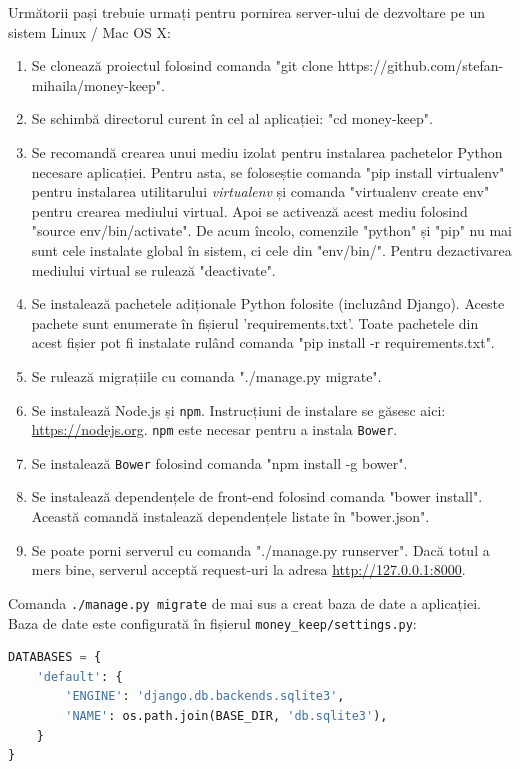 Următorii pași trebuie urmați pentru pornirea server-ului
de dezvoltare pe un sistem Linux / Mac OS X:
\begin{enumerate}
\item Se clonează proiectul folosind comanda
"git clone https://github.com/stefan-mihaila/money-keep".
\item Se schimbă directorul curent în cel al aplicației: "cd money-keep".
\item Se recomandă crearea unui mediu izolat pentru 
instalarea pachetelor Python necesare aplicației.
Pentru asta, se foloseștie comanda "pip install virtualenv"
pentru instalarea utilitarului \emph{virtualenv}
și comanda "virtualenv create env" pentru crearea
mediului virtual. Apoi se activează acest mediu
folosind "source env/bin/activate". De acum încolo,
comenzile "python" și "pip" nu mai sunt cele instalate
global în sistem, ci cele din "env/bin/". Pentru dezactivarea
mediului virtual se rulează "deactivate".
\item Se instalează pachetele adiționale Python folosite 
(incluzând Django). Aceste pachete sunt enumerate în fișierul
'requirements.txt'. Toate pachetele din acest fișier pot
fi instalate rulând comanda "pip install -r requirements.txt".
\item Se rulează migrațiile cu comanda "./manage.py migrate".
\item Se instalează Node.js și \texttt{npm}. Instrucțiuni de instalare se găsesc aici:
\url{https://nodejs.org}. \texttt{npm} este necesar pentru a instala \texttt{Bower}.
\item Se instalează \texttt{Bower} folosind comanda "npm install -g bower".
\item Se instalează dependențele de front-end folosind comanda
"bower install". Această comandă instalează dependențele listate
în "bower.json".
\item Se poate porni serverul cu comanda "./manage.py runserver". Dacă
totul a mers bine, serverul acceptă request-uri la adresa \url{http://127.0.0.1:8000}.
\end{enumerate}

Comanda \texttt{./manage.py migrate} de mai sus a creat baza de date
a aplicației. Baza de date este configurată în fișierul 
\texttt{money\_keep/settings.py}:

\begin{lstlisting}[language=python, title=Configurare implicită a bazei de date]
DATABASES = {
    'default': {
        'ENGINE': 'django.db.backends.sqlite3',
        'NAME': os.path.join(BASE_DIR, 'db.sqlite3'),
    }
}
\end{lstlisting}

